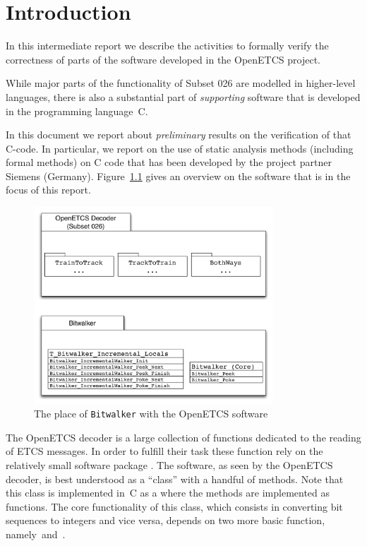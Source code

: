 
\chapter{Introduction}

In this intermediate report we describe the activities to formally verify
the correctness of parts of the software developed in the OpenETCS project.

While major parts of the functionality of {Subset 026} are modelled in 
higher-level languages, there is also a substantial part of \emph{supporting} software
that is developed in the programming language~C.

In this document we report about \emph{preliminary} results on the verification
of that C-code.
In particular, we report on the use of static analysis methods (including formal methods)
on C code that has been developed by the project partner Siemens (Germany).
Figure~\ref{fig:Bitwalker-Overview} gives an overview on the software that
is in the focus of this report.

\begin{figure}[hbt]
\begin{center}
\includegraphics[width=0.8\textwidth]{figures/Bitwalker-Overview.pdf}
\caption{\label{fig:Bitwalker-Overview} The place of \texttt{Bitwalker} with the OpenETCS software}
\end{center}
\end{figure}

The OpenETCS decoder is a large collection of functions dedicated to
the reading of ETCS messages.
In order to fulfill their task these function rely on the relatively
small software package .
The  software, as seen by the OpenETCS decoder,
is best understood as a ``class'' with a handful of methods.
Note that this class is implemented in~C as a  where
the methods are implemented as functions.
The core functionality  of this class, which consists in converting bit sequences to integers
and vice versa, depends on two more basic function, namely~\peek and~\poke.

